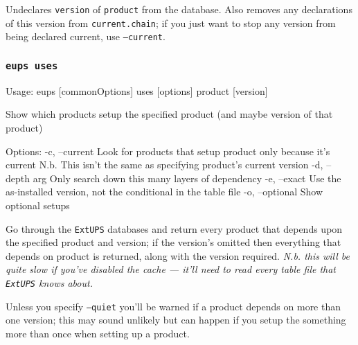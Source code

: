 \documentclass{article}
\newcommand{\code}[1]{\texttt{#1}}
\newcommand{\eups}{\code{ExtUPS}}
\let\overbatim=\verbatim
\let\oendverbatim=\endverbatim
\renewenvironment{verbatim}
{\center\minipage{16cm}\overbatim}
{\oendverbatim\endminipage\endcenter}
\begin{document}
Undeclares \code{version} of \code{product} from the database. Also
removes any declarations of this version from \code{current.chain}; if
you just want to stop any version from being declared current, use
\code{--current}.


\subsubsection{\code{eups uses}}
\begin{verbatim}
Usage:
    eups [commonOptions] uses [options] product [version]

Show which products setup the specified product (and maybe version of that product)

Options:
   -c, --current           Look for products that setup product only because it's current
                           N.b. This isn't the same as specifying product's current version
   -d, --depth      arg    Only search down this many layers of dependency
   -e, --exact             Use the as-installed version, not the conditional in the table file
   -o, --optional          Show optional setups
\end{verbatim}

Go through the \eups{} databases and return every product that depends upon the specified product and version;
if the version's omitted then everything that depends on product is returned, along with the version
required. \textit{N.b.  this will be quite slow if you've disabled the cache --- it'll need to read every table
  file that \eups{} knows about.}

Unless you specify \code{--quiet} you'll be warned if a product depends on
more than one version;  this may sound unlikely but can happen if you setup
the something more than once when setting up a product.

\end{document}
